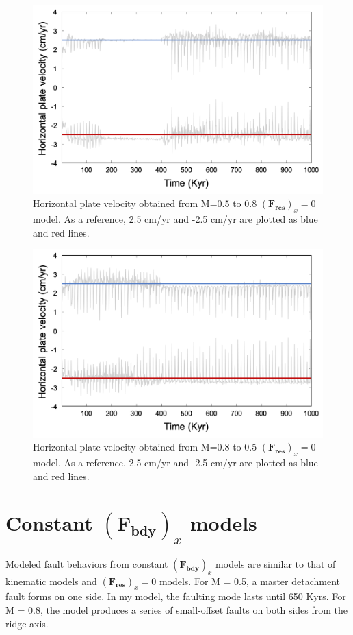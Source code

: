 \documentclass[letterpaper,12pt,notitle]{memphisthesis}                     %
\begin{document}
\begin{figure}[!htb]
	\centering
	\includegraphics[width=0.9\linewidth]{./figs/f0m05to08.png}
	\caption{Horizontal plate velocity obtained from M=0.5 to 0.8 $(\boldsymbol{F_{res}})_x=0$ model. As a reference, 2.5 cm/yr and -2.5 cm/yr are plotted as blue and red lines.}
	\label{fig:f005to08}
\end{figure}
\begin{figure}[!htb]
	\centering
	\includegraphics[width=0.9\linewidth]{./figs/f0m08to05.png}
	\caption{Horizontal plate velocity obtained from M=0.8 to 0.5 $(\boldsymbol{F_{res}})_x=0$ model. As a reference, 2.5 cm/yr and -2.5 cm/yr are plotted as blue and red lines.}
	\label{fig:f008to05}
\end{figure}

\section{Constant $(\boldsymbol{F_{bdy}})_x$ models}

Modeled fault behaviors from constant $(\boldsymbol{F_{bdy}})_x$ models are similar to that of kinematic models and  $(\boldsymbol{F_{res}})_x = 0$  models. For M = 0.5, a master detachment fault forms on one side. In my model, the  faulting mode lasts until 650 Kyrs. For M = 0.8, the model produces a series of small-offset faults on both sides from the ridge axis.
\end{document}

